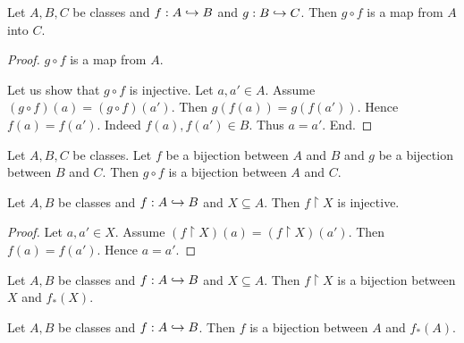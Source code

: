 \documentclass[../../set-theory/set-theory.tex]{subfiles}
\begin{document}
  \begin{forthel}
    \begin{proposition}
      Let $A, B, C$ be classes and $f : A \hookrightarrow B$ and $g : B \hookrightarrow C$.
      Then $g \circ f$ is a map from $A$ into $C$.
    \end{proposition}
    \begin{proof}
      $g \circ f$ is a map from $A$.

      Let us show that $g \circ f$ is injective.
        Let $a, a' \in A$.
        Assume $(g \circ f)(a) = (g \circ f)(a')$.
        Then $g(f(a)) = g(f(a'))$.
        Hence $f(a) = f(a')$.
        Indeed $f(a), f(a') \in B$.
        Thus $a = a'$.
      End.
    \end{proof}
  \end{forthel}

  \begin{forthel}
    \begin{corollary}
      Let $A, B, C$ be classes.
      Let $f$ be a bijection between $A$ and $B$ and $g$ be a bijection between $B$ and $C$.
      Then $g \circ f$ is a bijection between $A$ and $C$.
    \end{corollary}
  \end{forthel}

  \begin{forthel}
    \begin{proposition}
      Let $A, B$ be classes and $f : A \hookrightarrow B$ and $X \subseteq A$.
      Then $f \restriction X$ is injective.
    \end{proposition}
    \begin{proof}
      Let $a, a' \in X$.
      Assume $(f \restriction X)(a) = (f \restriction X)(a')$.
      Then $f(a) = f(a')$.
      Hence $a = a'$.
    \end{proof}
  \end{forthel}

  \begin{forthel}
    \begin{proposition}
      Let $A, B$ be classes and $f : A \hookrightarrow B$ and $X \subseteq A$.
      Then $f \restriction X$ is a bijection between $X$ and $f_{*}(X)$.
    \end{proposition}
  \end{forthel}

  \begin{forthel}
    \begin{corollary}
      Let $A, B$ be classes and $f : A \hookrightarrow B$.
      Then $f$ is a bijection between $A$ and $f_{*}(A)$.
    \end{corollary}
  \end{forthel}
\end{document}
